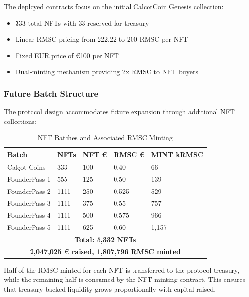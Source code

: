 \documentclass[conference]{IEEEtran}
\begin{document}
The deployed contracts focus on the initial CalcotCoin Genesis collection:
\begin{itemize}
    \item 333 total NFTs with 33 reserved for treasury
    \item Linear RMSC pricing from 222.22 to 200 RMSC per NFT
    \item Fixed EUR price of €100 per NFT
    \item Dual-minting mechanism providing 2x RMSC to NFT buyers
\end{itemize}

\subsubsection{Future Batch Structure}

The protocol design accommodates future expansion through additional NFT collections:

\begin{table}[ht]
\caption{NFT Batches and Associated RMSC Minting}
\centering
\scriptsize
\begin{tabular}{|p{1.5cm}|p{0.6cm}|p{0.7cm}|p{0.7cm}|p{0.7cm}|}
\hline
\textbf{Batch} & \textbf{NFTs} & \textbf{NFT €} & \textbf{RMSC €} & \textbf{MINT kRMSC} \\
\hline
Calçot Coins     & 333  & 100  & 0.40  & 66  \\
FounderPass 1    & 555  & 125  & 0.50  & 139  \\
FounderPass 2    & 1111 & 250  & 0.525 & 529  \\
FounderPass 3    & 1111 & 375  & 0.55  & 757  \\
FounderPass 4    & 1111 & 500  & 0.575 & 966  \\
FounderPass 5    & 1111 & 625  & 0.60  & 1,157  \\
\hline
\multicolumn{5}{|c|}{\textbf{Total: 5,332 NFTs}} \\
\multicolumn{5}{|c|}{\textbf{2,047,025 € raised, 1,807,796 RMSC minted}} \\
\hline
\end{tabular}
\end{table}






Half of the RMSC minted for each NFT is transferred to the protocol treasury, while the remaining half is consumed by the NFT minting contract. This ensures that treasury-backed liquidity grows proportionally with capital raised.
\end{document}
